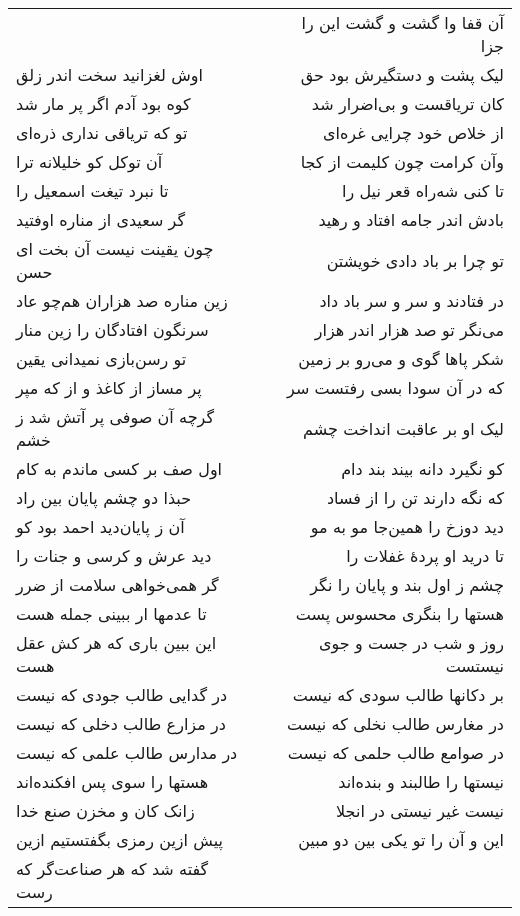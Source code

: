 \begin{center}
\begin{longtable}{l p{0.5cm} r}
&&
آن قفا وا گشت و گشت این را جزا
\\
اوش لغزانید سخت اندر زلق
&&
لیک پشت و دستگیرش بود حق
\\
کوه بود آدم اگر پر مار شد
&&
کان تریاقست و بی‌اضرار شد
\\
تو که تریاقی نداری ذره‌ای
&&
از خلاص خود چرایی غره‌ای
\\
آن توکل کو خلیلانه ترا
&&
وآن کرامت چون کلیمت از کجا
\\
تا نبرد تیغت اسمعیل را
&&
تا کنی شه‌راه قعر نیل را
\\
گر سعیدی از مناره اوفتید
&&
بادش اندر جامه افتاد و رهید
\\
چون یقینت نیست آن بخت ای حسن
&&
تو چرا بر باد دادی خویشتن
\\
زین مناره صد هزاران هم‌چو عاد
&&
در فتادند و سر و سر باد داد
\\
سرنگون افتادگان را زین منار
&&
می‌نگر تو صد هزار اندر هزار
\\
تو رسن‌بازی نمیدانی یقین
&&
شکر پاها گوی و می‌رو بر زمین
\\
پر مساز از کاغذ و از که مپر
&&
که در آن سودا بسی رفتست سر
\\
گرچه آن صوفی پر آتش شد ز خشم
&&
لیک او بر عاقبت انداخت چشم
\\
اول صف بر کسی ماندم به کام
&&
کو نگیرد دانه بیند بند دام
\\
حبذا دو چشم پایان بین راد
&&
که نگه دارند تن را از فساد
\\
آن ز پایان‌دید احمد بود کو
&&
دید دوزخ را همین‌جا مو به مو
\\
دید عرش و کرسی و جنات را
&&
تا درید او پردهٔ غفلات را
\\
گر همی‌خواهی سلامت از ضرر
&&
چشم ز اول بند و پایان را نگر
\\
تا عدمها ار ببینی جمله هست
&&
هستها را بنگری محسوس پست
\\
این ببین باری که هر کش عقل هست
&&
روز و شب در جست و جوی نیستست
\\
در گدایی طالب جودی که نیست
&&
بر دکانها طالب سودی که نیست
\\
در مزارع طالب دخلی که نیست
&&
در مغارس طالب نخلی که نیست
\\
در مدارس طالب علمی که نیست
&&
در صوامع طالب حلمی که نیست
\\
هستها را سوی پس افکنده‌اند
&&
نیستها را طالبند و بنده‌اند
\\
زانک کان و مخزن صنع خدا
&&
نیست غیر نیستی در انجلا
\\
پیش ازین رمزی بگفتستیم ازین
&&
این و آن را تو یکی بین دو مبین
\\
گفته شد که هر صناعت‌گر که رست

\end{longtable}
\end{center}
